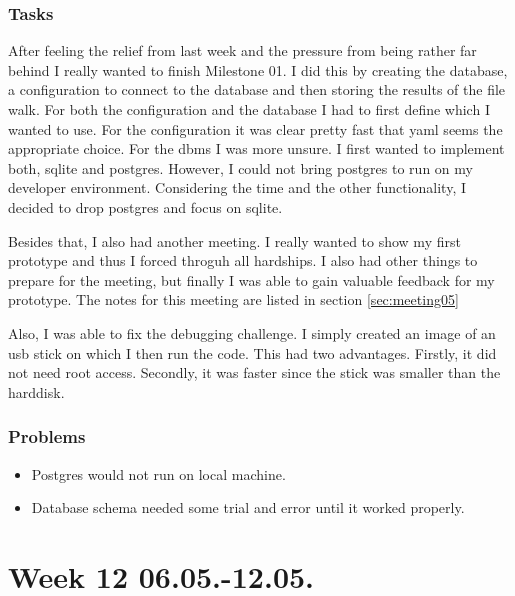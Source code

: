 \subsubsection{Tasks}

After feeling the relief from last week and the pressure from being rather far behind I really wanted to finish Milestone 01. I did this by creating the database, a configuration to connect to the database and then storing the results of the file walk. For both the configuration and the database I had to first define which I wanted to use. For the configuration it was clear pretty fast that \gls{yaml} seems the appropriate choice. For the \gls{dbms} I was more unsure. I first wanted to implement both, \gls{sqlite} and postgres. However, I could not bring postgres to run on my developer environment. Considering the time and the other functionality, I decided to drop postgres and focus on \gls{sqlite}.

Besides that, I also had another meeting. I really wanted to show my first prototype and thus I forced throguh all hardships. I also had other things to prepare for the meeting, but finally I was able to gain valuable feedback for my prototype. The notes for this meeting are listed in section \ref{sec:meeting05}

Also, I was able to fix the debugging challenge. I simply created an image of an usb stick on which I then run the code. This had two advantages. Firstly, it did not need root access. Secondly, it was faster since the stick was smaller than the harddisk.

\subsubsection{Problems}

\begin{itemize}
    \item Postgres would not run on local machine. 
    \item Database schema needed some trial and error until it worked properly.
\end{itemize}

\section{Week 12 06.05.-12.05.}
\label{sec:journal:week12}

